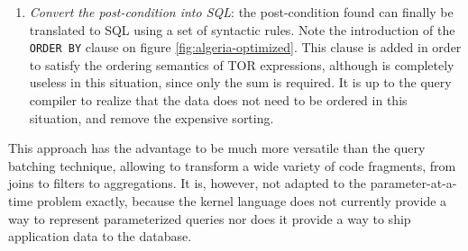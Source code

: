 \begin{enumerate}
\item{\emph{Convert the post-condition into SQL}: the post-condition found can finally be translated to SQL using a set of  syntactic rules. Note the introduction of the \texttt{ORDER BY} clause on figure \ref{fig:algeria-optimized}. This clause is added in order to satisfy the ordering semantics of TOR expressions, although is completely useless in this situation, since only the sum is required. It is up to the query compiler to realize that the data does not need to be ordered in this situation, and remove the expensive sorting.}
\end{enumerate}

This approach has the advantage to be much more versatile than the query batching technique, allowing to transform a wide variety of code fragments, from joins to filters to aggregations. It is, however, not adapted to the parameter-at-a-time problem exactly, because the kernel language does not currently provide a way to represent parameterized queries nor does it provide a way to ship application data to the database.